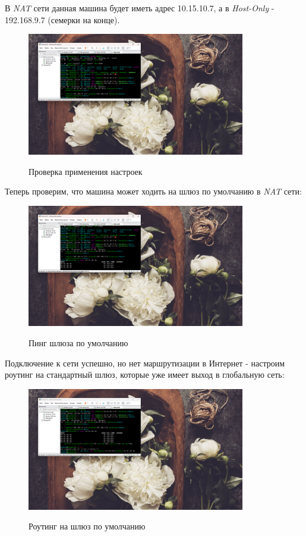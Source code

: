 \documentclass[a4paper]{article}
\begin{document}
  В \textit{NAT} сети данная машина будет иметь адрес 10.15.10.7, а в \textit{Host-Only} - 192.168.9.7 (семерки на конце).
  
  \begin{figure}[H]
    \centering
    \includegraphics[width=0.85\textwidth]{06_00 (91)}
    \label{img:91}
    \caption{Проверка применения настроек}
  \end{figure}

  Теперь проверим, что машина может ходить на шлюз по умолчанию в \textit{NAT} сети:
  
  \begin{figure}[H]
    \centering
    \includegraphics[width=0.85\textwidth]{06_00 (92)}
    \label{img:92}
    \caption{Пинг шлюза по умолчанию}
  \end{figure}
  
  Подключение к сети успешно, но нет маршрутизации в Интернет - настроим роутинг на 
  стандартный шлюз, которые уже имеет выход в глобальную сеть:

  \begin{figure}[H]
    \centering
    \includegraphics[width=0.85\textwidth]{06_00 (93)}
    \label{img:93}
    \caption{Роутинг на шлюз по умолчанию}
  \end{figure}
\end{document}
